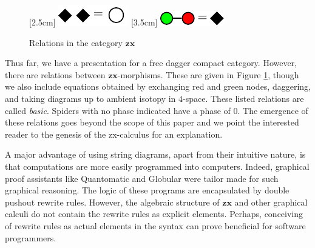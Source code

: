 \documentclass[./1--Catfying_zxCalc--Master.tex]{subfiles} %
\begin{document}
\begin{figure}
{\begin{minipage}{\textwidth}
{			}
			\quad \quad \quad \quad \quad \quad 
			\vspace{1em} 
			\linebreak
			[2.5cm]{%
				\centering
				\includegraphics{InclGrphx--equation--loop}
			}
			[3.5cm]{%
				\centering
				\includegraphics{InclGrphx--equation--diamond}
			}
		\end{minipage}
	}
	\caption{Relations in the category $\mathbf{zx}$}
	\label{fig:ZX equations}
\end{figure}

Thus far, we have a 
presentation for a 
free dagger compact category. 
However, there are relations 
between $\mathbf{zx}$-morphisms.
These are given in Figure \ref{fig:ZX equations},  
though we also include equations obtained by 
exchanging red and green nodes, 
daggering, and 
taking diagrams up to 
ambient isotopy in $4$-space. 
These listed relations are called \emph{basic}.  
Spiders with no phase indicated 
have a phase of $0$. 
The emergence of these relations 
goes beyond the scope of this paper
and we point the interested reader to
the genesis of the zx-calculus 
	\cite{CoeckeDuncan_QuantumObsFullPaper}
for an explanation.

A major advantage 
of using string diagrams, 
apart from their intuitive nature, 
is that computations are 
more easily programmed into 
computers.  
Indeed, graphical proof assistants
like Quantomatic 
	\cite{BarKissingerVicary_Globular,
		DixonDuncanKissinger_QuantomaticWebsite} 
and Globular 
	\cite{BarKissingerVicary_Globular} 
were tailor made for such 
graphical reasoning.  
The logic of these programs are 
encapsulated by 
double pushout rewrite rules.  
However, 
the algebraic structure of $\mathbf{zx}$ 
and other graphical calculi 
do not contain the rewrite rules 
as explicit elements.  
Perhaps, 
conceiving of rewrite rules 
as actual elements
in the syntax can prove
beneficial for software programmers.

% 
\end{document}
